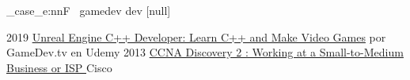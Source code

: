 \documentclass[9pt]{developercv} %
\begin{document}
\vspace{0.5cm}



\MainTechnologies{\langsa}{\jobtype}
\hfill
\ContributonsAndForks{\langsa}{\jobtype}
\hfill
\AdditionalInformation{\langsa}{\jobtype}

\ExplSyntaxOn

\str_case_e:nnF~{\jobtype}
{
	{gamedev}{
		\Projects{\langsa}{\jobtype}
		\JobExperience{\langsa}{\jobtype}
		}
	{dev}
	{
		\JobExperience{\langsa}{\jobtype}
		\Projects{\langsa}{\jobtype}
	}
}
{[null]}%

\ExplSyntaxOff


\Education{\langsa}{\jobtype}


\begin{entrylist}
		\entry
		{2019}
		{\href{https://www.udemy.com/certificate/UC-OHE75YJE/}{Unreal Engine C++ Developer: Learn C++ and Make Video Games}}
		{ por GameDev.tv en Udemy}{}
	\entry
		{2013}
		{\href{https://gabuscuv.github.io/img/certificates/CCNA2.jpg}{CCNA Discovery 2 : Working at a Small-to-Medium Business or ISP }}
		{Cisco}{}
\end{entrylist}
\end{document}
